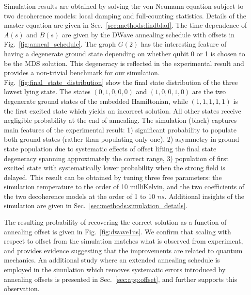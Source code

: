 \documentclass[prd,twocolumn,tightenlines,preprintnumbers,showpacs,superscriptaddress,notitlepage,nofootinbib,eqsecnum,
floatfix,longbibliography,aps,10pt]{revtex4-2}
\begin{document}
Simulation results are obtained by solving the von Neumann equation subject to two decoherence models: local damping and full-counting statistics. Details of the master equation are given in Sec.~\ref{sec:methods:lindblad}. The time dependence of $A(s)$ and $B(s)$ are given by the DWave annealing schedule with offsets in Fig.~\ref{fig:anneal_schedule}. The graph $G(2)$ has the interesting feature of having a degenerate ground state depending on whether qubit 0 or 1 is chosen to be the MDS solution. This degeneracy is reflected in the experimental result and provides a non-trivial benchmark for our simulation. Fig.~\ref{fig:final_state_distribution} show the final state distribution of the three lowest lying state. The states $(0, 1, 0, 0, 0)$ and $(1, 0, 0, 1, 0)$ are the two degenerate ground states of the embedded Hamiltonian, while $(1, 1, 1, 1, 1)$ is the first excited state which yields an incorrect solution. All other states receive negligible probability at the end of annealing. The simulation (black) captures main features of the experimental result: 1) significant probability to populate both ground states (rather than populating only one), 2) asymmetry in ground state population due to systematic effects of offset lifting the final state degeneracy spanning approximately the correct range, 3) population of first excited state with systematically lower probability when the strong field is delayed. This result can be obtained by tuning three free parameters: the simulation temperature to the order of 10 milliKelvin, and the two coefficients of the two decoherence models at the order of 1 to 10 $ns$. Additional insights of the simulation are given in Sec.~\ref{sec:methods:simulation_details}.

The resulting probability of recovering the correct solution as a function of annealing offset is given in Fig.~\ref{fig:dwave1us}. We confirm that scaling with respect to offset from the simulation matches what is observed from experiment, and provides evidence suggesting that the improvements are related to quantum mechanics. An additional study where an extended annealing schedule is employed in the simulation which removes systematic errors introduced by annealing offsets is presented in Sec.~\ref{sec:app:offset}, and further supports this observation.
\end{document}
